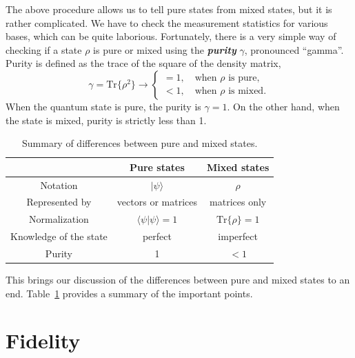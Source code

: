 The above procedure allows us to tell pure states from mixed states, but it is rather complicated.
We have to check the measurement statistics for various bases, which can be quite laborious.
Fortunately, there is a very simple way of checking if a state $\rho$ is pure or mixed using the \textbf{\emph{purity}} $\gamma$, pronounced ``gamma''.
Purity is defined as the trace of the square of the density matrix,
\begin{equation}
    \gamma = \text{Tr} \{ \rho^2 \} \longrightarrow \begin{cases}
        = 1, \quad \text{when } \rho \text{ is pure}, \\
        < 1, \quad \text{when } \rho \text{ is mixed}.
    \end{cases}
\end{equation}
When the quantum state is pure, the purity is $\gamma=1$.
On the other hand, when the state is mixed, purity is strictly less than 1.

\begin{table}[t]
    \setcellgapes{5pt}
    \renewcommand\theadfont{}
    \makegapedcells
    \centering
    \begin{tabular}{ccc}
        \hline
        & \textbf{Pure states} & \textbf{Mixed states} \\
        \hline
        Notation & $|\psi\rangle$ & $\rho$ \\
        Represented by & vectors or matrices & matrices only \\
        Normalization & $\langle\psi|\psi\rangle=1$ & $\text{Tr}\{\rho\}=1$ \\
        Knowledge of the state & perfect & imperfect \\
        Purity & 1 & $<1$ \\
        \hline
    \end{tabular}
    \caption[Pure versus mixed states]{Summary of differences between pure and mixed states.}
    \label{tab:3-4_pure_vs_mixed}
\end{table}

This brings our discussion of the differences between pure and mixed states to an end.
Table~\ref{tab:3-4_pure_vs_mixed} provides a summary of the important points.




\section{Fidelity}
\label{sec:3-5_fidelity}

